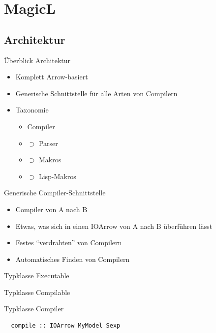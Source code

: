 \documentclass{beamer}
\newcommand{\pfeil}{\item[$\Rightarrow$]}
\begin{document}
\section{MagicL}

\subsection{Architektur}

\begin{frame}{Überblick Architektur}
  \begin{itemize}
  \item Komplett Arrow-basiert
  \pfeil Generische Schnittstelle für alle Arten von Compilern
  \item Taxonomie \\
    \begin{itemize}
    \item[] Compiler 
    \item[] $\supset$ Parser 
    \item[] $\supset$ Makros 
    \item[] $\supset$ Lisp-Makros
    \end{itemize}
  \end{itemize}
\end{frame}

\begin{frame}[fragile]{Generische Compiler-Schnittstelle}
  \begin{itemize}
  \item Compiler von A nach B
  \item Etwas, was sich in einen IOArrow von A nach B überführen lässt
  \item Festes ``verdrahten'' von Compilern
    \pfeil Automatisches Finden von Compilern
  \end{itemize}
\end{frame}

\begin{frame}{Typklasse Executable}

\end{frame}

\begin{frame}{Typklasse Compilable}
  
\end{frame}

\begin{frame}[fragile]{Typklasse Compiler}
  \begin{verbatim}
  compile :: IOArrow MyModel Sexp
  \end{verbatim}  
\end{frame}
\end{document}
